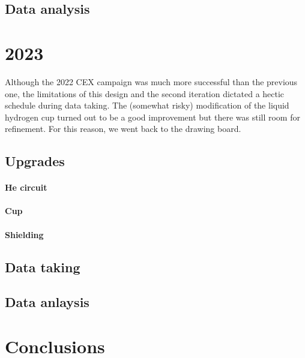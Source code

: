 \begin{refsection}
    \subsection{Data analysis}

\section{2023}
    Although the 2022 CEX campaign was much more successful than the previous one, the limitations of this design and the second iteration dictated a hectic schedule during data taking. 
    The (somewhat risky) modification of the liquid hydrogen cup turned out to be a good improvement but there was still room for refinement. 
    For this reason, we went back to the drawing board.

    \subsection{Upgrades}
        \paragraph{He circuit}
        \paragraph{Cup}
        \paragraph{Shielding}
    \subsection{Data taking}
    \subsection{Data anlaysis}

\section{Conclusions}

\printbibliography[
    heading = bibliographychapter,
    title=Bibliography on \ce{LH2}
]

\end{refsection}
